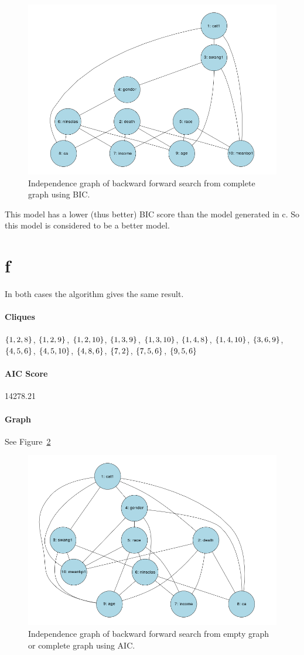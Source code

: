\documentclass[12pt]{article}
\theoremstyle{definition}
\begin{document}
\begin{figure}[H]
    \centering
    \includegraphics[width=0.8\linewidth]{e.png}
    \caption{Independence graph of backward forward search from complete graph using BIC.}
\label{fig:e}
\end{figure}

This model has a lower (thus better) BIC score than the model generated in c.
So this model is considered to be a better model.

\section*{f}
In both cases the algorithm gives the same result.

\paragraph{Cliques}
$\set{1,2,8}$, $\set{1,2,9}$, $\set{1,2,10}$, $\set{1,3,9}$, $\set{1,3,10}$, $\set{1,4,8}$,
$\set{1,4,10}$, $\set{3,6,9}$, $\set{4,5,6}$, $\set{4,5,10}$, $\set{4,8,6}$, $\set{7,2}$,
$\set{7,5,6}$, $\set{9,5,6}$

\paragraph{AIC Score} 14278.21

\paragraph{Graph} See Figure~\ref{fig:f}

\begin{figure}[H]
    \centering
    \includegraphics[width=0.8\linewidth]{f.png}
    \caption{Independence graph of backward forward search from empty graph or complete graph using AIC.}
\label{fig:f}
\end{figure}
\end{document}
